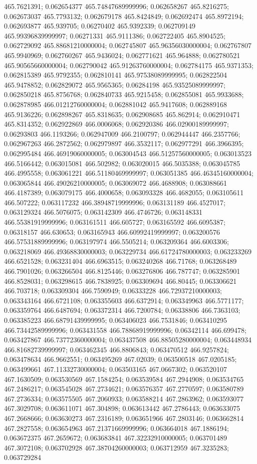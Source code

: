 465.7621391; 0.062654377 465.74847689999996; 0.062658267 465.8216275; 0.062673037 465.7793132; 0.062679178 465.8424849; 0.062692474 465.8972194; 0.062693877 465.939705; 0.06270402 465.9392339; 0.062709149 465.99396839999997; 0.06271331 465.9111386; 0.062722405 465.8904525; 0.062729092 465.88681210000004; 0.062745807 465.96356030000004; 0.062767807 465.9940969; 0.062760267 465.9436024; 0.062771621 465.964888; 0.062780521 465.90565660000004; 0.062790042 465.91263760000004; 0.062784175 465.9371353; 0.062815389 465.9792355; 0.062810141 465.97538089999995; 0.062822504 465.9478852; 0.062829072 465.9565365; 0.06284198 465.93525089999997; 0.062850218 465.8756768; 0.062840733 465.9215458; 0.062855081 465.9933688; 0.062878985 466.01212760000004; 0.062881042 465.9417608; 0.062889168 465.9136226; 0.062898267 465.8318635; 0.062908685 465.862914; 0.062910471 465.8314352; 0.062922869 466.0006068; 0.062920386 466.02900189999997; 0.06293803 466.1193266; 0.062947009 466.2100797; 0.062944447 466.2357766; 0.062967263 466.2872562; 0.062979897 466.3532117; 0.062977291 466.3966395; 0.062995484 466.46919060000005; 0.063004543 466.51257560000005; 0.063013523 466.5166442; 0.063015081 466.502982; 0.063020015 466.5035388; 0.063045785 466.4995558; 0.063061221 466.51180469999997; 0.063051385 466.46345160000004; 0.063065844 466.49026210000005; 0.063069072 466.4688908; 0.063088661 466.4187389; 0.063079175 466.4000658; 0.063093328 466.4682055; 0.063105611 466.507222; 0.063117232 466.38948719999996; 0.063131189 466.4527017; 0.063129324 466.5076075; 0.063142309 466.4746726; 0.063148331 466.55381919999996; 0.063161511 466.605727; 0.063165592 466.6095387; 0.06318157 466.630653; 0.063165943 466.60992419999997; 0.063200576 466.57531889999996; 0.063197974 466.5505214; 0.063209364 466.6003306; 0.063218069 466.49368830000003; 0.063229734 466.61724780000003; 0.063233269 466.6521528; 0.063231404 466.6963515; 0.063240268 466.71768; 0.063268489 466.7901026; 0.063266504 466.8125446; 0.063276806 466.787747; 0.063285901 466.8528031; 0.063298615 466.7838925; 0.063309694 466.80445; 0.063306621 466.703718; 0.063309304 466.7590949; 0.06333228 466.72937210000003; 0.063343164 466.6721108; 0.063355603 466.6372914; 0.063349963 466.5771177; 0.063359764 466.6487694; 0.063372314 466.7200784; 0.06338806 466.7363103; 0.063385223 466.68791439999995; 0.063406023 466.7531846; 0.063410295 466.73442589999996; 0.063431558 466.78868919999996; 0.06342114 466.699478; 0.063427867 466.73772360000004; 0.063437508 466.88505280000004; 0.063448934 466.81682739999997; 0.063462345 466.8806843; 0.063470512 466.9257824; 0.063478634 466.9662551; 0.063495269 467.02039; 0.063500518 467.0205185; 0.063499661 467.11332730000004; 0.063503165 467.0667302; 0.063520107 467.1630509; 0.063530569 467.1584254; 0.063539584 467.2944908; 0.063534765 467.2486217; 0.063545028 467.2734621; 0.063576357 467.2770597; 0.063580789 467.2736334; 0.063575505 467.2060933; 0.063588214 467.2863962; 0.063593077 467.3029708; 0.063611071 467.304898; 0.063613442 467.2786443; 0.063633075 467.2668666; 0.063630273 467.2316189; 0.063651966 467.2803146; 0.063662814 467.2827558; 0.063654963 467.21371669999996; 0.063664018 467.1886194; 0.063672375 467.2659672; 0.063683841 467.32232910000005; 0.063701489 467.3072108; 0.063702928 467.38704260000003; 0.063712959 467.3235283; 0.063729284 
